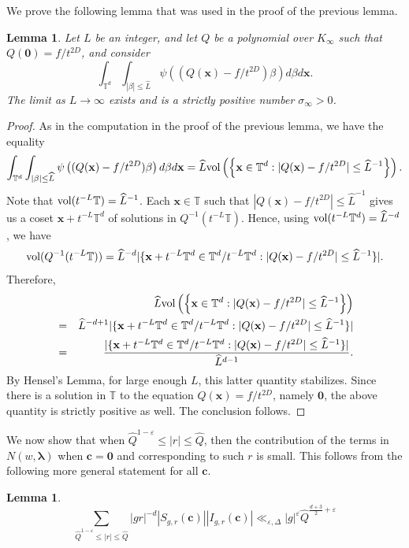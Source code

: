 \documentclass[11pt]{amsart}
\theoremstyle{plain}
\theoremstyle{plain}
\newtheorem{lemma}[theorem]{Lemma}
\renewcommand{\vec}[1]{\mathbf{#1}}
\theoremstyle{remark}
\theoremstyle{definition}
\renewcommand{\hat}{\widehat}
\newcommand{\hQ}{\widehat{Q}}
\newcommand{\TT}{\mathbb{T}}
\newcommand{\vol}{\textup{vol}}
\begin{document}
We prove the following lemma that was used in the proof of the previous lemma.
\begin{lemma}\label{lem:stable}Let $L$ be an integer, and let $Q$ be a polynomial over $K_{\infty}$ such that $Q(\vec{0})=f/t^{2D}$, and consider
\[\int_{\TT^d}\int_{|\beta|\leq\hat{L}}\psi\left((Q(\vec{x})-f/t^{2D})\beta\right)d\beta d\vec{x}.\]
The limit as $L\rightarrow\infty$ exists and is a strictly positive number $\sigma_{\infty}>0$.
\end{lemma}
\begin{proof}
As in the computation in the proof of the previous lemma, we have the equality
\[\int_{\TT^d}\int_{|\beta|\leq\hat{L}}\psi\left((Q(\vec{x})-f/t^{2D})\beta\right)d\beta d\vec{x}=\hat{L}\vol\left(\left\{\vec{x}\in\TT^d:|Q(\vec{x})-f/t^{2D}|\leq \hat{L}^{-1}\right\}\right).\]
Note that $\vol(t^{-L}\TT)=\hat{L}^{-1}$. Each $\vec{x}\in\TT$ such that $|Q(\vec{x})-f/t^{2D}|\leq\hat{L}^{-1}$ gives us a coset $\vec{x}+t^{-L}\TT^d$ of solutions in $Q^{-1}(t^{-L}\TT)$. Hence, using $\vol(t^{-L}\TT^d)=\hat{L}^{-d}$, we have
\[\vol(Q^{-1}(t^{-L}\TT))=\hat{L}^{-d}|\{\vec{x}+t^{-L}\TT^d\in\TT^d/t^{-L}\TT^d:|Q(\vec{x})-f/t^{2D}|\leq\hat{L}^{-1}\}|.\]
Therefore,
\begin{eqnarray*}&&\hat{L}\vol\left(\left\{\vec{x}\in\TT^d:|Q(\vec{x})-f/t^{2D}|\leq \hat{L}^{-1}\right\}\right)\\&=&\hat{L}^{-d+1}|\{\vec{x}+t^{-L}\TT^d\in\TT^d/t^{-L}\TT^d:|Q(\vec{x})-f/t^{2D}|\leq\hat{L}^{-1}\}|\\&=&
\frac{|\{\vec{x}+t^{-L}\TT^d\in\TT^d/t^{-L}\TT^d:|Q(\vec{x})-f/t^{2D}|\leq\hat{L}^{-1}\}|}{\hat{L}^{d-1}}.
\end{eqnarray*}
By Hensel's Lemma, for large enough $L$, this latter quantity stabilizes. Since there is a solution in $\TT$ to the equation $Q(\vec{x})=f/t^{2D}$, namely $\vec{0}$, the above quantity is strictly positive as well. The conclusion follows.
\end{proof}
We now show that when $\hQ^{1-\varepsilon}\leq |r|\leq\hQ$, then the contribution of the terms in $N(w,\boldsymbol{\lambda})$ when $\vec{c}=\vec{0}$ and corresponding to such $r$ is small. This follows from the following more general statement for all $\vec{c}$.
\begin{lemma}\label{lem:small} 
\[\sum_{\hQ^{1-\varepsilon}\leq |r|\leq\hQ}|gr|^{-d}|S_{g,r}(\vec{c})||I_{g,r}(\vec{c})|\ll_{\varepsilon,\Delta}|g|^{\varepsilon}\hQ^{\frac{d+3}{2}+\varepsilon}\]
\end{lemma}
\end{document}
